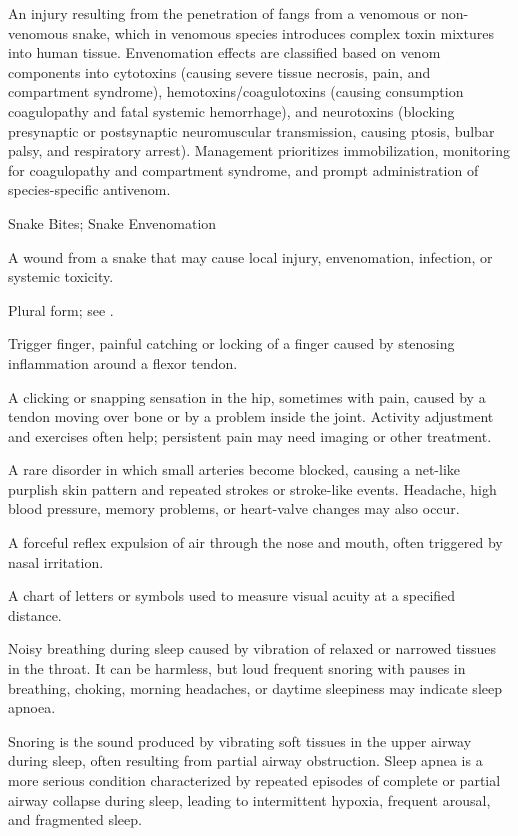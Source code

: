  An injury resulting from the penetration of fangs from a venomous or non-venomous snake, which in venomous species introduces complex toxin mixtures into human tissue. Envenomation effects are classified based on venom components into cytotoxins (causing severe tissue necrosis, pain, and compartment syndrome), hemotoxins/coagulotoxins (causing consumption coagulopathy and fatal systemic hemorrhage), and neurotoxins (blocking presynaptic or postsynaptic neuromuscular transmission, causing ptosis, bulbar palsy, and respiratory arrest). Management prioritizes immobilization, monitoring for coagulopathy and compartment syndrome, and prompt administration of species-specific antivenom.

\synonyms
Snake Bites; Snake Envenomation

 A wound from a snake that may cause local injury, envenomation, infection, or systemic toxicity.

 Plural form; see .

 Trigger finger, painful catching or locking of a finger caused by stenosing inflammation around a flexor tendon.

 A clicking or snapping sensation in the hip, sometimes with pain, caused by a tendon moving over bone or by a problem inside the joint. Activity adjustment and exercises often help; persistent pain may need imaging or other treatment.

 A rare disorder in which small arteries become blocked, causing a net-like purplish skin pattern and repeated strokes or stroke-like events. Headache, high blood pressure, memory problems, or heart-valve changes may also occur.

 A forceful reflex expulsion of air through the nose and mouth, often triggered by nasal irritation.

 A chart of letters or symbols used to measure visual acuity at a specified distance.

 Noisy breathing during sleep caused by vibration of relaxed or narrowed tissues in the throat. It can be harmless, but loud frequent snoring with pauses in breathing, choking, morning headaches, or daytime sleepiness may indicate sleep apnoea.

 Snoring is the sound produced by vibrating soft tissues in the upper airway during
sleep, often resulting from partial airway obstruction. Sleep apnea is a more serious
condition characterized by repeated episodes of complete or partial airway collapse
during sleep, leading to intermittent hypoxia, frequent arousal, and fragmented sleep.

